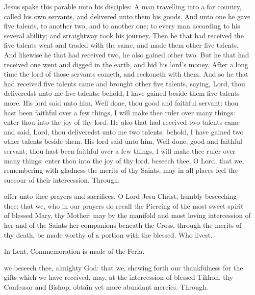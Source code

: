  Jesus spake this parable unto his disciples: A man travelling into a far country, called his own servants, and delivered unto them his goods. And unto one he gave five talents, to another two, and to another one; to every man according to his several ability; and straightway took his journey. Then he that had received the five talents went and traded with the same, and made them other five talents. And likewise he that had received two, he also gained other two. But he that had received one went and digged in the earth, and hid his lord's money. After a long time the lord of those servants cometh, and reckoneth with them. And so he that had received five talents came and brought other five talents, saying, Lord, thou deliveredst unto me five talents: behold, I have gained beside them five talents more. His lord said unto him, Well done, thou good and faithful servant: thou hast been faithful over a few things, I will make thee ruler over many things: enter thou into the joy of thy lord. He also that had received two talents came and said, Lord, thou deliveredst unto me two talents: behold, I have gained two other talents beside them. His lord said unto him, Well done, good and faithful servant; thou hast been faithful over a few things, I will make thee ruler over many things: enter thou into the joy of thy lord.
\secret
{} beseech thee, O Lord, that we, remembering with gladness the merits of thy Saints, may in all places feel the succour of their intercession. Through.

 offer unto thee prayers and sacrifices, O Lord Jesu Christ, humbly beseeching thee: that we, who in our prayers do recall the Piercing of the most sweet spirit of blessed Mary, thy Mother; may by the manifold and most loving intercession of her and of the Saints her companions beneath the Cross, through the merits of thy death, be made worthy of a portion with the blessed. Who livest.
\begin{rubric}
    In Lent, Commemoration is made of the Feria.%
\end{rubric}

\postcommunion
{} we beseech thee, almighty God: that we, shewing forth our thankfulness for the gifts which we have received, may, at the intercession of blessed Tikhon, thy Confessor and Bishop, obtain yet more abundant mercies. Through.

